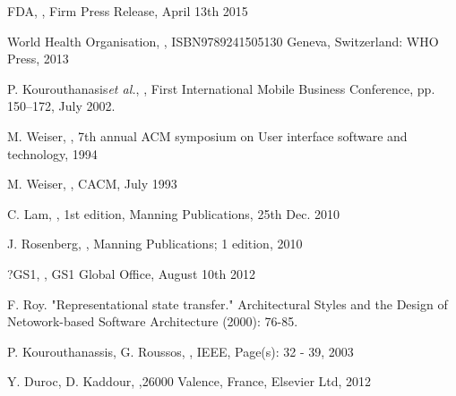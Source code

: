\documentclass[a4paper, 11pt]{article}
\begin{document}
\begin{thebibliography}{29}
FDA, \emph{}, Firm Press Release, April 13th 2015

World Health Organisation, \emph{}, ISBN9789241505130 Geneva, Switzerland: WHO Press, 2013
\vspace{\baselineskip}

P. Kourouthanasis\emph{et al.}, \emph{}, First International Mobile Business Conference, pp. 150--172, July 2002.
\vspace{\baselineskip}

M. Weiser, \emph{}, 7th annual ACM symposium on User interface software and technology, 1994
\vspace{\baselineskip}

M. Weiser, \emph{}, CACM, July 1993
\vspace{\baselineskip}

C. Lam, \emph{}, 1st edition, Manning Publications, 25th Dec. 2010
\vspace{\baselineskip}

J. Rosenberg, \emph{}, Manning Publications; 1 edition, 2010
\vspace{\baselineskip}

?GS1, \emph{}, GS1 Global Office, August 10th 2012
\vspace{\baselineskip}

F. Roy. "Representational state transfer." Architectural Styles and the Design of Netowork-based Software Architecture (2000): 76-85.

P. Kourouthanassis, G. Roussos, \emph{}, IEEE, Page(s): 32	- 39, 2003
\vspace{\baselineskip}

Y. Duroc, D. Kaddour, \emph{},26000 Valence, France, Elsevier Ltd, 2012
\vspace{\baselineskip}

\end{thebibliography}
\end{document}
